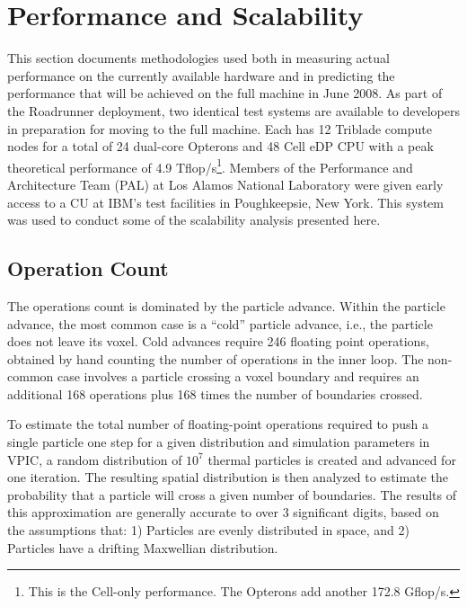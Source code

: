 \documentclass[10pt]{article}
\begin{document}
\section{Performance and Scalability} \label{sec:performance}

This section documents methodologies used both in measuring actual
performance on the currently available hardware and in predicting the
performance that will be achieved on the full machine in June
2008.  As part of the Roadrunner deployment, two identical test
systems are available to developers in preparation for moving to the
full machine.  Each has 12 Triblade compute nodes for a total of 24 
dual-core Opterons and 48 Cell eDP CPU with a peak theoretical 
performance of 4.9 Tflop/s\footnote{This is the Cell-only performance.  
The Opterons add another 172.8 Gflop/s.}.  
Members of the
Performance and Architecture Team (PAL) at Los Alamos National
Laboratory were given early access to a CU at IBM's test facilities in
Poughkeepsie, New York.  This system was used to conduct some of the
scalability analysis presented here.

\subsection{Operation Count}

The operations count is dominated by the particle advance.  Within the
particle advance, the most common case is a ``cold'' particle advance,
i.e., the particle does not leave its voxel.  Cold 
advances require 246 floating point operations, obtained by hand
counting the number of %
operations in the inner loop.  The non-common case involves a particle
crossing a voxel boundary and requires an additional 168 operations plus 
168 times the number of boundaries crossed.

To estimate the total number of floating-point operations required to
push a single particle one step for a given distribution and
simulation parameters in VPIC, a random distribution of $10^7$ thermal
particles is created and advanced for one iteration.  The resulting
spatial distribution is then analyzed to estimate the probability that
a particle will cross a given number of boundaries.  The results of
this approximation are generally accurate to over 3 significant
digits, based on the assumptions that: 1) Particles are evenly
distributed in space, and 2) Particles have a drifting Maxwellian
distribution.
\end{document}
